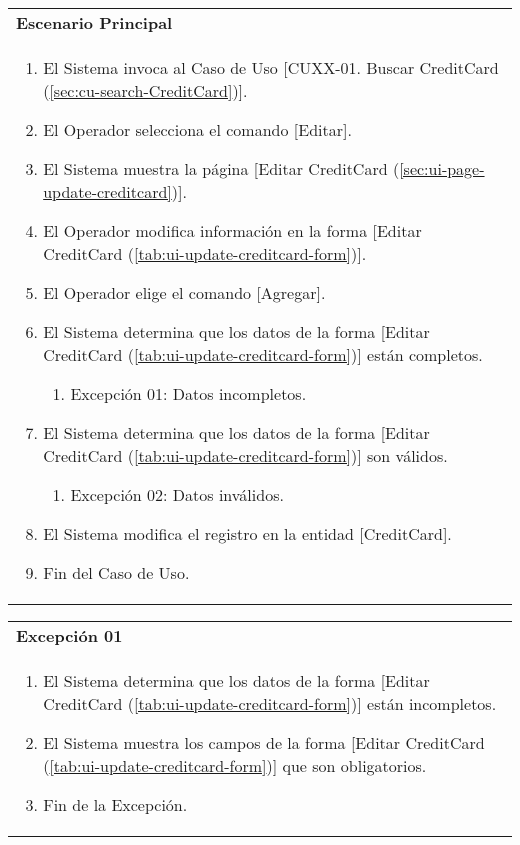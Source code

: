 	\begin{tabular}{ p{15.5cm} }
		\textbf{Escenario Principal} \\
		\begin{enumerate}
			\item El Sistema invoca al Caso de Uso [CUXX-01. Buscar CreditCard (\ref{sec:cu-search-CreditCard})].
			\item El Operador selecciona el comando [Editar].
			\item El Sistema muestra la p\'agina [Editar CreditCard (\ref{sec:ui-page-update-creditcard})].
			\item El Operador modifica informaci\'on en la forma [Editar CreditCard (\ref{tab:ui-update-creditcard-form})].
			\item El Operador elige el comando [Agregar].
			\item El Sistema determina que los datos de la forma [Editar CreditCard (\ref{tab:ui-update-creditcard-form})] est\'an completos.
				\begin{enumerate}
					\item Excepci\'on 01: Datos incompletos.
				\end{enumerate}
			\item El Sistema determina que los datos de la forma [Editar CreditCard (\ref{tab:ui-update-creditcard-form})] son v\'alidos.
				\begin{enumerate}
					\item Excepci\'on 02: Datos inv\'alidos.
				\end{enumerate}
			\item El Sistema modifica el registro en la entidad [CreditCard].
			\item Fin del Caso de Uso.
		\end{enumerate}
	\end{tabular}
	
	\begin{tabular}{ p{15.5cm} }
		\textbf{Excepci\'on 01} \\
		\begin{enumerate}
			\item El Sistema determina que los datos de la forma [Editar CreditCard (\ref{tab:ui-update-creditcard-form})] est\'an incompletos.
			\item El Sistema muestra los campos de la forma [Editar CreditCard (\ref{tab:ui-update-creditcard-form})] que son obligatorios.
			\item Fin de la Excepci\'on.
		\end{enumerate}
	\end{tabular}
	
